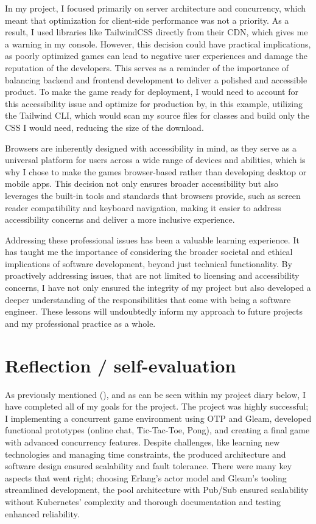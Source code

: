 \documentclass[]{final}
\begin{document}
In my project, I focused primarily on server architecture and concurrency,
which meant that optimization for client-side performance was not a
priority. As a result, I used libraries like TailwindCSS directly from
their CDN, which gives me a warning in my console.%
However, this decision could have practical implications,
as poorly optimized games can lead to negative user experiences and
damage the reputation of the developers. This serves as a reminder
of the importance of balancing backend and frontend development to
deliver a polished and accessible product. To make the game ready for
deployment, I would need to account for this accessibility issue and optimize for production
by, in this example, utilizing the Tailwind CLI, which would scan my source files for
classes and build only the CSS I would need, reducing the size of
the download.

Browsers are inherently designed with accessibility in mind, as they serve
as a universal platform for users across a wide range of devices and
abilities, which is why I chose to make the games browser-based rather than
developing desktop or mobile apps. This decision not only ensures broader
accessibility but also leverages the built-in tools and standards that
browsers provide, such as screen reader compatibility and keyboard navigation,
making it easier to address accessibility concerns and deliver a more
inclusive experience.

Addressing these professional issues has been a valuable learning experience.
It has taught me the importance of considering the broader societal and
ethical implications of software development, beyond just technical
functionality. By proactively addressing issues, that are not limited to
licensing and accessibility concerns, I have not only ensured the integrity of my
project but also developed a deeper understanding of the responsibilities
that come with being a software engineer. These lessons will
undoubtedly inform my approach to future projects and my professional
practice as a whole.

\chapter{Reflection / self-evaluation}

As previously mentioned {\hypersetup{linkcolor=teal}(\pageref{valkeyMessageBroker})}, and as can be seen within my project diary below,
I have completed all of my goals for the project.
The project was highly successful; I implementing a concurrent game environment
using OTP and Gleam, developed functional prototypes (online chat, Tic-Tac-Toe,
Pong), and creating a final game with advanced concurrency features.
Despite challenges, like learning new technologies and managing time
constraints, the produced architecture and software design ensured
scalability and fault tolerance.
There were many key aspects that went right; choosing Erlang’s actor model
and Gleam’s tooling streamlined development,
the pool architecture with Pub/Sub ensured scalability without Kubernetes’
complexity and thorough documentation and testing enhanced reliability.
\end{document}
